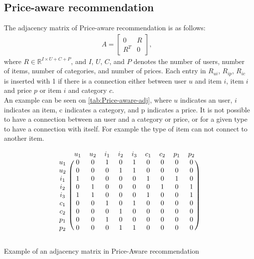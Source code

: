 \subsection{Price-aware recommendation}
The adjacency matrix of Price-aware recommendation is as follows:
\begin{gather}
    A =
    \begin{bmatrix}
        0   & R \\
        R^T & 0
    \end{bmatrix},
\end{gather}
where $R \in \mathbb{R}^{I \times U+C+P}$, and $I$, $U$, $C$, and $P$ denotes the number of users, number of items, number of categories, and number of prices.
Each entry in $R_{ui}$, $R_{ip}$, $R_{ic}$ is inserted with 1 if there is a connection either between user $u$ and item $i$, item $i$ and price $p$ or item $i$ and category $c$.\\
An example can be seen on \autoref{tab:Price-aware-adj}, where $u$ indicates an user, $i$ indicates an item, c indicates a category, and p indicates a price.
It is not possible to have a connection between an user and a category or price, or for a given type to have a connection with itself.
For example the type of item can not connect to another item.
\begin{table}
    \[
        \begin{blockarray}{cccccccccc}
            & u_1 & u_2 & i_1 & i_2 & i_3 & c_1 & c_2 & p_1 & p_2 \\
            \begin{block}{c(ccccccccc)}
                u_1 & 0 & 0 & 1 & 0 & 1 & 0 & 0 & 0 & 0   \\
                u_2 & 0 & 0 & 0 & 1 & 1 & 0 & 0 & 0 & 0  \\
                i_1 & 1 & 0 & 0 & 0 & 0 & 1 & 0 & 1 & 0  \\
                i_2 & 0 & 1 & 0 & 0 & 0 & 0 & 1 & 0 & 1  \\
                i_3 & 1 & 1 & 0 & 0 & 0 & 1 & 0 & 0 & 1  \\
                c_1 & 0 & 0 & 1 & 0 & 1 & 0 & 0 & 0 & 0  \\
                c_2 & 0 & 0 & 0 & 1 & 0 & 0 & 0 & 0 & 0  \\
                p_1 & 0 & 0 & 1 & 0 & 0 & 0 & 0 & 0 & 0  \\
                p_2 & 0 & 0 & 0 & 1 & 1 & 0 & 0 & 0 & 0  \\
            \end{block}
        \end{blockarray}
    \]
    \caption{Example of an adjacency matrix in Price-Aware recommendation}
    \label{tab:Price-aware-adj}
\end{table}